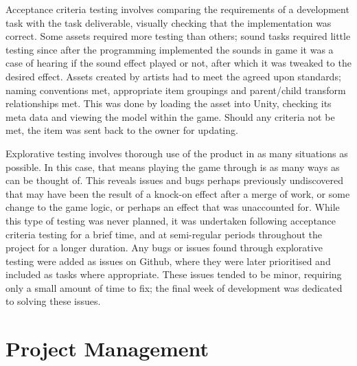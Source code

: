 \documentclass[12pt]{article}
\begin{document}
Acceptance criteria testing involves comparing the requirements of a development task with the task deliverable, visually checking that the implementation was correct. Some assets required more testing than others; sound tasks required little testing since after the programming implemented the sounds in game it was a case of hearing if the sound effect played or not, after which it was tweaked to the desired effect. Assets created by artists had to meet the agreed upon standards; naming conventions met, appropriate item groupings and parent/child transform relationships met. This was done by loading the asset into Unity, checking its meta data and viewing the model within the game. Should any criteria not be met, the item was sent back to the owner for updating. 

Explorative testing involves thorough use of the product in as many situations as possible. In this case, that means playing the game through is as many ways as can be thought of. This reveals issues and bugs perhaps previously undiscovered that may have been the result of a knock-on effect after a merge of work, or some change to the game logic, or perhaps an effect that was unaccounted for. While this type of testing was never planned, it was undertaken following acceptance criteria testing for a brief time, and at semi-regular periods throughout the project for a longer duration. Any bugs or issues found through explorative testing were added as issues on Github, where they were later prioritised and included as tasks where appropriate. These issues tended to be minor, requiring only a small amount of time to fix; the final week of development was dedicated to solving these issues. 


\section{Project Management}
\end{document}
